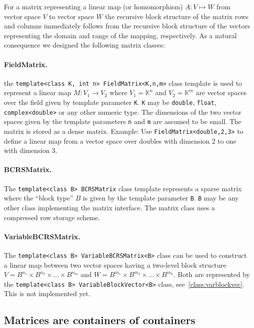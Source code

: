 \documentclass[11pt]{article}
\newcommand{\K}{\mathbb{K}}
\begin{document}
For a matrix representing a linear map (or homomorphism) $A: V \mapsto
W$ from vector space $V$ to vector space $W$ the recursive block
structure of the matrix rows and columns immediately follows
 from the recursive block structure of the vectors representing
the domain and range of the mapping, respectively. As a natural
consequence we designed the following matrix classes:

\paragraph{FieldMatrix.}
the \lstinline!template<class K, int n> FieldMatrix<K,n,m>! class
template is used to represent a linear map $M: V_1 \to V_2$ where
$V_1=\K^n$ and $V_2=\K^m$ are vector spaces over the field given by
template parameter \lstinline!K!. \lstinline!K! may be \lstinline!double!, \lstinline!float!,
\lstinline!complex<double>! or any other numeric type.
The dimensions of the two vector spaces  given by the template parameters
\lstinline!n! and \lstinline!m! are assumed to be small. The matrix is
stored as a dense matrix.
Example: Use \lstinline!FieldMatrix<double,2,3>! to define a linear
map from a vector space over doubles with dimension $2$ to one with
dimension $3$.

\paragraph{BCRSMatrix.}
The \lstinline!template<class B> BCRSMatrix! class template represents
a sparse matrix where the ``block type'' $B$ is given by the template
parameter \lstinline!B!. \lstinline!B! may be any other class
implementing the matrix interface.  The matrix class uses
a compressed row storage scheme.

\paragraph{VariableBCRSMatrix.}

The \lstinline!template<class B> VariableBCRSMatrix<B>! class can be
used to construct a linear map between two vector spaces having a two-level
block structure $V=B^{n_1}\times B^{n_2}\times\ldots \times B^{n_m}$
and $W=B^{m_1}\times B^{m_2}\times\ldots \times B^{m_k}$. Both are
represented by the 
\lstinline!template<class B> VariableBlockVector<B>! class,
see~\ref{class:varblockvec}. This is not implemented yet.

\subsection[Matrix containers]{Matrices are containers of containers}
\end{document}

